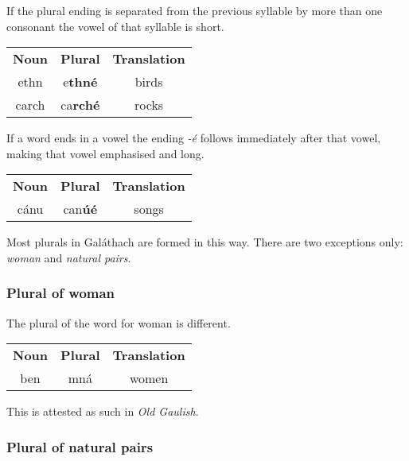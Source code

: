 If the plural ending is separated from the previous syllable by more than one consonant the vowel of that syllable is short.
\begin{table}[H]
\centering
\begin{tabular}{ccc}
  \toprule
  \textbf{Noun} & \textbf{Plural} & \textbf{Translation}\\
  \cmidrule(lr){1-1}\cmidrule(lr){2-2}\cmidrule(lr){3-3}
  ethn & e\textbf{thn\'{e}} & birds\\
  carch & ca\textbf{rch\'{e}} & rocks\\
  \bottomrule
\end{tabular}
\label{example_plural_multiple_consonants}
\end{table}

If a word ends in a vowel the ending \textit{-\'{e}} follows immediately after that vowel, making that vowel emphasised and long.
\begin{table}[H]
\centering
\begin{tabular}{ccc}
  \toprule
  \textbf{Noun} & \textbf{Plural} & \textbf{Translation}\\
  \cmidrule(lr){1-1}\cmidrule(lr){2-2}\cmidrule(lr){3-3}
  c\'{a}nu & can\textbf{\'{u}\'{e}} & songs\\
  \bottomrule
\end{tabular}
\label{example_plural_ends_in_vowel}
\end{table}

Most plurals in Gal\'{a}thach are formed in this way. There are two exceptions only: \textit{woman} and \textit{natural pairs}.

\subsubsection{Plural of woman}

The plural of the word for woman is different.
\begin{table}[H]
\centering
\begin{tabular}{ccc}
  \toprule
  \textbf{Noun} & \textbf{Plural} & \textbf{Translation}\\
  \cmidrule(lr){1-1}\cmidrule(lr){2-2}\cmidrule(lr){3-3}
  ben & mn\'{a} & women\\
  \bottomrule
\end{tabular}
\label{example_plural_of_woman}
\end{table}

This is attested as such in \textit{Old Gaulish}.

\subsubsection{Plural of natural pairs}

